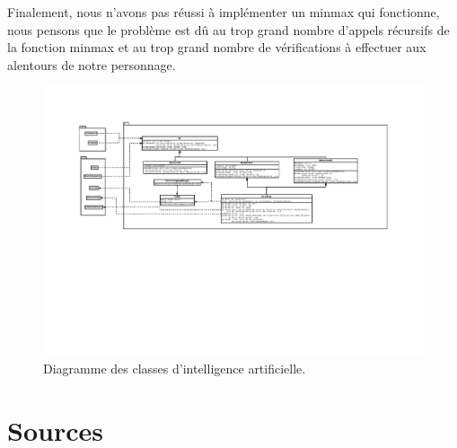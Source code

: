 \documentclass[a4paper,12pt]{article}
\begin{document}
Finalement, nous n'avons pas réussi à implémenter un minmax qui fonctionne, nous pensons que le problème est dû au trop grand nombre d'appels récursifs de la fonction minmax et au trop grand nombre de vérifications à effectuer aux alentours de notre personnage.

\begin{landscape}
\begin{figure}[p]
\includegraphics[width=0.9\paperheight]{ai.pdf}
\caption{\label{uml:ai}Diagramme des classes d'intelligence artificielle.} 
\end{figure}
\end{landscape}


%
%


%
\section*{Sources}

\end{document}
